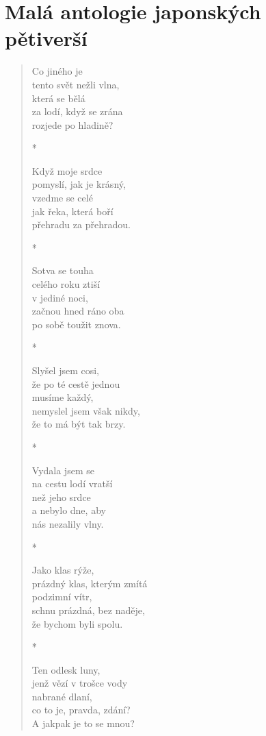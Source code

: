 \section{Malá antologie japonských \\ pětiverší}

\begin{verse}
Co jiného je\\
tento svět nežli vlna, \\
která se bělá\\
za lodí, když se zrána\\
rozjede po hladině?

*

Když moje srdce\\
pomyslí, jak je krásný,\\
vzedme se celé\\
jak řeka, která boří\\
přehradu za přehradou.

*

Sotva se touha\\
celého roku ztiší\\
v jediné noci, \\
začnou hned ráno oba\\
po sobě toužit znova.

* 

Slyšel jsem cosi,\\
že po té cestě jednou \\
musíme každý, \\
nemyslel jsem však nikdy, \\
že to má být tak brzy.

*

Vydala jsem se \\
na cestu lodí vratší\\
než jeho srdce\\
a nebylo dne, aby\\
nás nezalily vlny.

*

Jako klas rýže,\\
prázdný klas, kterým zmítá \\
podzimní vítr,\\
schnu prázdná, bez naděje, \\
že bychom byli spolu. 

*

Ten odlesk luny,\\
jenž vězí v trošce vody\\
nabrané dlaní,\\
co to je, pravda, zdání?\\
A jakpak je to se mnou?  


\end{verse}
